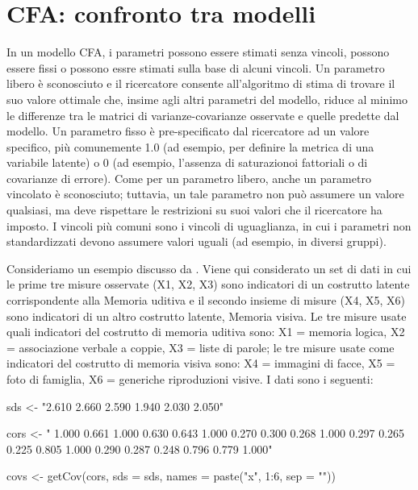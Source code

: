 \documentclass[
  11pt,
]{krantz}
\makeatletter
\newenvironment{Shaded}{\begin{snugshade}}{\end{snugshade}}
\newcommand{\AttributeTok}[1]{\textcolor[rgb]{0.61,0.61,0.61}{#1}}
\newcommand{\DecValTok}[1]{\textcolor[rgb]{0.06,0.06,0.06}{#1}}
\newcommand{\FunctionTok}[1]{\textcolor[rgb]{0,0,0}{#1}}
\newcommand{\NormalTok}[1]{#1}
\newcommand{\OtherTok}[1]{\textcolor[rgb]{0.37,0.37,0.37}{#1}}
\newcommand{\SpecialCharTok}[1]{\textcolor[rgb]{0,0,0}{#1}}
\newcommand{\StringTok}[1]{\textcolor[rgb]{0.5,0.5,0.5}{#1}}
\newenvironment{kframe}{%
\medskip{}
\setlength{\fboxsep}{.8em}
 \def\at@end@of@kframe{}%
 \ifinner\ifhmode%
  \def\at@end@of@kframe{\end{minipage}}%
  \begin{minipage}{\columnwidth}%
 \fi\fi%
 \def\FrameCommand##1{\hskip\@totalleftmargin \hskip-\fboxsep
 \colorbox{shadecolor}{##1}\hskip-\fboxsep
     \hskip-\linewidth \hskip-\@totalleftmargin \hskip\columnwidth}%
 \MakeFramed {\advance\hsize-\width
   \@totalleftmargin\z@ \linewidth\hsize
   \@setminipage}}%
 {\par\unskip\endMakeFramed%
 \at@end@of@kframe}
\renewenvironment{Shaded}{\begin{kframe}}{\end{kframe}}
\theoremstyle{definition}
\theoremstyle{definition}
\theoremstyle{definition}
\theoremstyle{definition}
\theoremstyle{remark}
\makeatother
\begin{document}
\hypertarget{ch:cfa-cong-parall}{%
\chapter{CFA: confronto tra modelli}\label{ch:cfa-cong-parall}}

In un modello CFA, i parametri possono essere stimati senza vincoli, possono essere fissi o possono essre stimati sulla base di alcuni vincoli. Un parametro libero è sconosciuto e il ricercatore consente all'algoritmo di stima di trovare il suo valore ottimale che, insime agli altri parametri del modello, riduce al minimo le differenze tra le matrici di varianze-covarianze osservate e quelle predette dal modello. Un parametro fisso è pre-specificato dal ricercatore ad un valore specifico, più comunemente 1.0 (ad esempio, per definire la metrica di una variabile latente) o 0 (ad esempio, l'assenza di saturazionoi fattoriali o di covarianze di errore). Come per un parametro libero, anche un parametro vincolato è sconosciuto; tuttavia, un tale parametro non può assumere un valore qualsiasi, ma deve rispettare le restrizioni su suoi valori che il ricercatore ha imposto. I vincoli più comuni sono i vincoli di uguaglianza, in cui i parametri non standardizzati devono assumere valori uguali (ad esempio, in diversi gruppi).

Consideriamo un esempio discusso da \citet{brown2015confirmatory}. Viene qui considerato un set di dati in cui le prime tre misure osservate (X1, X2, X3) sono indicatori di un costrutto latente corrispondente alla Memoria uditiva e il secondo insieme di misure (X4, X5, X6) sono indicatori di un altro costrutto latente, Memoria visiva. Le tre misure usate quali indicatori del costrutto di memoria uditiva sono: X1 = memoria logica, X2 = associazione verbale a coppie, X3 = liste di parole; le tre misure usate come indicatori del costrutto di memoria visiva sono: X4 = immagini di facce, X5 = foto di famiglia, X6 = generiche riproduzioni visive. I dati sono i seguenti:

\begin{Shaded}
\begin{Highlighting}[]
\NormalTok{sds }\OtherTok{\textless{}{-}} \StringTok{"2.610  2.660  2.590  1.940  2.030  2.050"}

\NormalTok{cors }\OtherTok{\textless{}{-}} \StringTok{"}
\StringTok{  1.000}
\StringTok{  0.661  1.000}
\StringTok{  0.630  0.643  1.000}
\StringTok{  0.270  0.300  0.268  1.000}
\StringTok{  0.297  0.265  0.225  0.805  1.000}
\StringTok{  0.290  0.287  0.248  0.796  0.779  1.000"}

\NormalTok{covs }\OtherTok{\textless{}{-}} \FunctionTok{getCov}\NormalTok{(cors, }\AttributeTok{sds =}\NormalTok{ sds, }\AttributeTok{names =} \FunctionTok{paste}\NormalTok{(}\StringTok{"x"}\NormalTok{, }\DecValTok{1}\SpecialCharTok{:}\DecValTok{6}\NormalTok{, }\AttributeTok{sep =} \StringTok{""}\NormalTok{))}
\end{Highlighting}
\end{Shaded}
\end{document}
